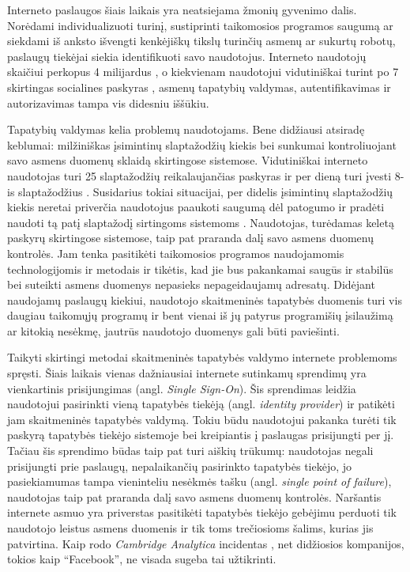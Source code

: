 Interneto paslaugos šiais laikais yra neatsiejama žmonių gyvenimo dalis.
Norėdami individualizuoti turinį, sustiprinti taikomosios programos saugumą ar siekdami
iš anksto išvengti kenkėjiškų tikslų turinčių asmenų ar sukurtų robotų, paslaugų tiekėjai
siekia identifikuoti savo naudotojus. Interneto naudotojų skaičiui perkopus 4 milijardus \cite{InternetUsers2018},
o kiekvienam naudotojui vidutiniškai turint po 7 skirtingas socialines paskyras \cite{Mander2017}, asmenų
tapatybių valdymas, autentifikavimas ir autorizavimas tampa vis didesniu iššūkiu.

Tapatybių valdymas kelia problemų naudotojams. Bene didžiausi atsiradę keblumai:
milžiniškas įsimintinų slaptažodžių kiekis bei sunkumai kontroliuojant savo asmens duomenų sklaidą
skirtingose sistemose. Vidutiniškai interneto naudotojas turi 25 slaptažodžių reikalaujančias paskyras
ir per dieną turi įvesti 8-is slaptažodžius \cite{Florencio2007}. Susidarius tokiai situacijai, per didelis įsimintinų slaptažodžių kiekis neretai 
priverčia naudotojus paaukoti saugumą dėl patogumo
ir pradėti naudoti tą patį slaptažodį sirtingoms sistemoms \cite{Pashalidis2003, Samar1999}. Naudotojas, turėdamas keletą
paskyrų skirtingose sistemose, taip pat praranda dalį savo asmens duomenų kontrolės. Jam tenka pasitikėti
taikomosios programos naudojamomis technologijomis ir metodais ir tikėtis, kad jie bus pakankamai saugūs
ir stabilūs bei suteikti asmens duomenys nepasieks nepageidaujamų adresatų. Didėjant naudojamų paslaugų kiekiui,
naudotojo skaitmeninės tapatybės duomenis turi vis daugiau taikomųjų programų ir bent vienai iš jų
patyrus programišių įsilaužimą ar kitokią nesėkmę, jautrūs naudotojo duomenys gali būti paviešinti. 

Taikyti skirtingi metodai skaitmeninės tapatybės valdymo internete problemoms spręsti. 
Šiais laikais vienas dažniausiai internete sutinkamų sprendimų yra vienkartinis prisijungimas (angl. \textit{Single Sign-On}).
Šis sprendimas leidžia naudotojui pasirinkti
vieną tapatybės tiekėją (angl. \textit{identity provider}) ir patikėti jam skaitmeninės tapatybės valdymą. Tokiu
būdu naudotojui pakanka turėti tik paskyrą tapatybės tiekėjo sistemoje bei kreipiantis į paslaugas prisijungti per jį.
Tačiau šis sprendimo būdas taip pat turi aiškių trūkumų: naudotojas negali prisijungti
prie paslaugų, nepalaikančių pasirinkto tapatybės tiekėjo, jo pasiekiamumas
tampa vieninteliu nesėkmės tašku (angl. \textit{single point of failure}), naudotojas taip pat praranda dalį savo asmens duomenų kontrolės.
Naršantis internete asmuo yra priverstas pasitikėti tapatybės tiekėjo
gebėjimu perduoti tik naudotojo leistus asmens duomenis ir tik toms trečiosioms šalims, kurias jis patvirtina.
Kaip rodo \textit{Cambridge Analytica} incidentas \cite{CambridgeAnalytica}, net didžiosios kompanijos, tokios
kaip \enquote{Facebook}, ne visada sugeba tai užtikrinti.

